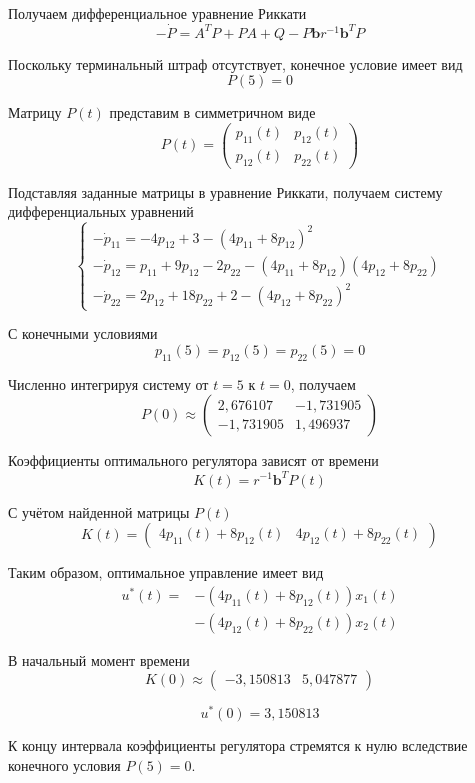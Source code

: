 Получаем дифференциальное уравнение Риккати
\[
-\dot P=A^TP+PA+Q-P\bm b r^{-1}\bm b^TP
\]

Поскольку терминальный штраф отсутствует,
конечное условие имеет вид
\[
P(5)=0
\]

Матрицу $P(t)$ представим в симметричном виде
\[
P(t)=
\begin{pmatrix}
p_{11}(t)&p_{12}(t)\\
p_{12}(t)&p_{22}(t)
\end{pmatrix}
\]

Подставляя заданные матрицы в уравнение Риккати,
получаем систему дифференциальных уравнений
\[
\begin{cases}
-\dot p_{11}=-4p_{12}+3-
(4p_{11}+8p_{12})^2\\[2mm]
-\dot p_{12}=p_{11}+9p_{12}-2p_{22}-
(4p_{11}+8p_{12})(4p_{12}+8p_{22})\\[2mm]
-\dot p_{22}=2p_{12}+18p_{22}+2-
(4p_{12}+8p_{22})^2
\end{cases}
\]

С конечными условиями
\[
p_{11}(5)=p_{12}(5)=p_{22}(5)=0
\]

Численно интегрируя систему от $t=5$ к $t=0$,
получаем
\[
P(0)\approx
\begin{pmatrix}
2{,}676107&-1{,}731905\\
-1{,}731905&1{,}496937
\end{pmatrix}
\]

Коэффициенты оптимального регулятора зависят от времени
\[
K(t)=r^{-1}\bm b^TP(t)
\]

С учётом найденной матрицы $P(t)$
\[
K(t)=
\begin{pmatrix}
4p_{11}(t)+8p_{12}(t)&
4p_{12}(t)+8p_{22}(t)
\end{pmatrix}
\]

Таким образом, оптимальное управление имеет вид
\[
\begin{aligned}
u^*(t)
={}&-\left(4p_{11}(t)+8p_{12}(t)\right)x_1(t)\\
&-\left(4p_{12}(t)+8p_{22}(t)\right)x_2(t)
\end{aligned}
\]

В начальный момент времени
\[
K(0)\approx
\begin{pmatrix}
-3{,}150813&5{,}047877
\end{pmatrix}
\]

\[
u^*(0)=3{,}150813
\]

К концу интервала коэффициенты регулятора
стремятся к нулю вследствие конечного условия
$P(5)=0$.

